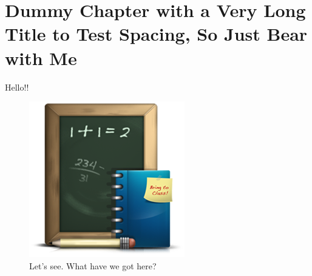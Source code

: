 \chapter{Dummy Chapter with a Very Long Title to Test Spacing, So Just Bear with Me}

Hello!!

\begin{figure}[hbt!]
\centering
\includegraphics[width=.3\textwidth]{school}
\caption{Let's see. What have we got here?}
\end{figure}
